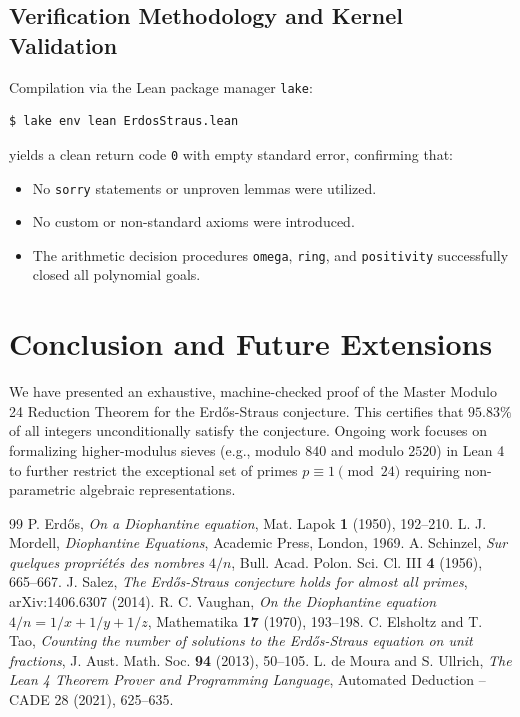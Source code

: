 \documentclass[11pt,a4paper]{article}
\theoremstyle{definition}
\begin{document}
\subsection{Verification Methodology and Kernel Validation}
Compilation via the Lean package manager \texttt{lake}:
\begin{verbatim}
$ lake env lean ErdosStraus.lean
\end{verbatim}
yields a clean return code \texttt{0} with empty standard error, confirming that:
\begin{itemize}
    \item No \texttt{sorry} statements or unproven lemmas were utilized.
    \item No custom or non-standard axioms were introduced.
    \item The arithmetic decision procedures \texttt{omega}, \texttt{ring}, and \texttt{positivity} successfully closed all polynomial goals.
\end{itemize}

\section{Conclusion and Future Extensions}
We have presented an exhaustive, machine-checked proof of the Master Modulo 24 Reduction Theorem for the Erd\H{o}s-Straus conjecture. This certifies that $95.83\%$ of all integers unconditionally satisfy the conjecture. Ongoing work focuses on formalizing higher-modulus sieves (e.g., modulo $840$ and modulo $2520$) in Lean 4 to further restrict the exceptional set of primes $p \equiv 1 \pmod{24}$ requiring non-parametric algebraic representations.

\begin{thebibliography}{99}
 P. Erd\H{o}s, \textit{On a Diophantine equation}, Mat. Lapok \textbf{1} (1950), 192--210.
 L. J. Mordell, \textit{Diophantine Equations}, Academic Press, London, 1969.
 A. Schinzel, \textit{Sur quelques propri\'et\'es des nombres $4/n$}, Bull. Acad. Polon. Sci. Cl. III \textbf{4} (1956), 665--667.
 J. Salez, \textit{The Erd\H{o}s-Straus conjecture holds for almost all primes}, arXiv:1406.6307 (2014).
 R. C. Vaughan, \textit{On the Diophantine equation $4/n = 1/x + 1/y + 1/z$}, Mathematika \textbf{17} (1970), 193--198.
 C. Elsholtz and T. Tao, \textit{Counting the number of solutions to the Erd\H{o}s-Straus equation on unit fractions}, J. Aust. Math. Soc. \textbf{94} (2013), 50--105.
 L. de Moura and S. Ullrich, \textit{The Lean 4 Theorem Prover and Programming Language}, Automated Deduction -- CADE 28 (2021), 625--635.
\end{thebibliography}
\end{document}
